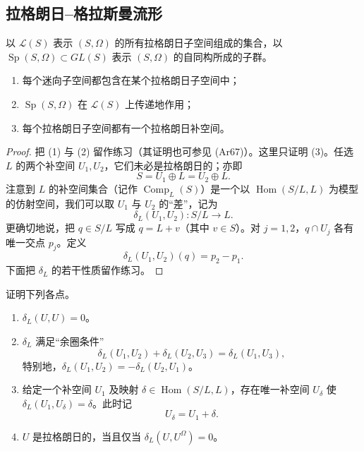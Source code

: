 \subsection{拉格朗日--格拉斯曼流形}
\label{subsec:lagrangian-grassmannian}

\begin{definition}\label{def:lagrangian-grassmannian}
以 $\mathcal L(S)$ 表示 $(S,\Omega)$ 的所有拉格朗日子空间组成的集合，以
$\operatorname{Sp}(S,\Omega)\subset GL(S)$ 表示 $(S,\Omega)$ 的自同构所成的子群。
\end{definition}

\begin{proposition}\label{prop:lagrangian-linear-basics}
\begin{enumerate}[label=(\arabic*)]
\item 每个迷向子空间都包含在某个拉格朗日子空间中；
\item $\operatorname{Sp}(S,\Omega)$ 在 $\mathcal L(S)$ 上传递地作用；
\item 每个拉格朗日子空间都有一个拉格朗日补空间。
\end{enumerate}
\end{proposition}

\begin{proof}
把 (1) 与 (2) 留作练习（其证明也可参见 (Ar67)）。这里只证明 (3)。任选 $L$ 的两个补空间 $U_1,U_2$，它们未必是拉格朗日的；亦即
\[
 S=U_1\oplus L=U_2\oplus L.
\]
注意到 $L$ 的补空间集合（记作 $\operatorname{Comp}_L(S)$）是一个以
$\operatorname{Hom}(S/L,L)$ 为模型的仿射空间，我们可以取 $U_1$ 与 $U_2$ 的“差”，记为
\[
 \delta_L(U_1,U_2):S/L\longrightarrow L.
\]
更确切地说，把 $q\in S/L$ 写成 $q=L+v$（其中 $v\in S$）。对 $j=1,2$，$q\cap U_j$ 各有唯一交点 $p_j$。定义
\begin{equation}
 \delta_L(U_1,U_2)(q)=p_2-p_1.
 \label{eq:complement-difference}
\end{equation}
下面把 $\delta_L$ 的若干性质留作练习。
\end{proof}

\begin{exercise}\label{ex:complement-difference-properties}
证明下列各点。
\begin{enumerate}[label=(\arabic*)]
\item $\delta_L(U,U)=0$。
\item $\delta_L$ 满足“余圈条件”
\begin{equation}
 \delta_L(U_1,U_2)+\delta_L(U_2,U_3)=\delta_L(U_1,U_3),
 \label{eq:complement-cocycle}
\end{equation}
特别地，$\delta_L(U_1,U_2)=-\delta_L(U_2,U_1)$。
\item 给定一个补空间 $U_1$ 及映射 $\delta\in\operatorname{Hom}(S/L,L)$，存在唯一补空间 $U_\delta$ 使
$\delta_L(U_1,U_\delta)=\delta$。此时记
\begin{equation}
 U_\delta=U_1+\delta.
 \label{eq:affine-complement-notation}
\end{equation}
\item $U$ 是拉格朗日的，当且仅当 $\delta_L(U,U^\Omega)=0$。
\end{enumerate}
\end{exercise}

